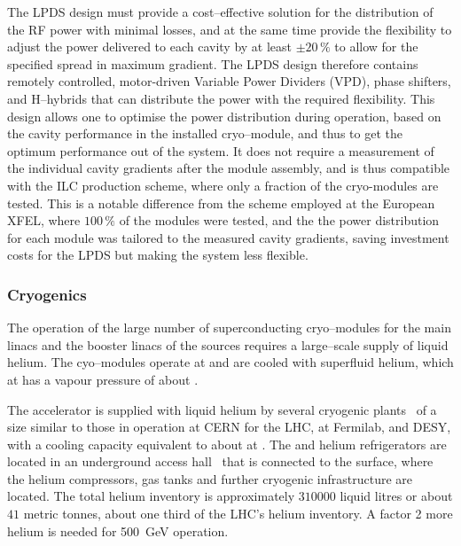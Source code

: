 The LPDS design must provide a cost--effective solution for the  distribution of 
the RF power with minimal losses, and at the same time provide the 
flexibility to adjust the power delivered to each cavity by at least $\pm20\,\%$ to allow for 
the specified spread in maximum gradient. 
The LPDS design therefore contains remotely controlled, motor-driven Variable Power Dividers (VPD), phase shifters, and H--hybrids that can distribute the power with the required flexibility.
This design allows one to optimise the power distribution during operation, based on the cavity performance in the installed cryo--module, and thus to get the optimum performance out of the system.
It does not require a measurement of the individual cavity gradients after the module assembly, and is thus compatible with the ILC production scheme, where only a fraction of the cryo-modules are tested.
This is a notable difference from  the scheme employed at the European XFEL, where $100\,\%$ of the modules were tested, and the the power distribution for each module was tailored to the measured cavity gradients, saving investment costs for the LPDS but making the system less flexible.

\subsubsection{Cryogenics}

The operation of the large number of superconducting cryo--modules for the main linacs and the booster linacs of the sources requires a large--scale supply of liquid helium.
The cyo--modules operate at  and are cooled with superfluid helium, which at  has a vapour pressure of about .


The accelerator is supplied with liquid helium by several cryogenic plants~\cite[Sec. 3.5]{Adolphsen:2013kya} of a size similar to those in operation at CERN for the LHC, at Fermilab, and DESY,
with a cooling capacity equivalent to about  at .
The  and  helium refrigerators are located in an underground access hall~\cite{bib:cr-0014} that is connected to the surface, where the helium compressors, gas tanks and further cryogenic infrastructure are located.
The total helium inventory is approximately $310 000$ liquid litres or about $41$ metric tonnes, about one third of the LHC's helium inventory.  A factor 2 more helium is needed for 
500~GeV operation.



